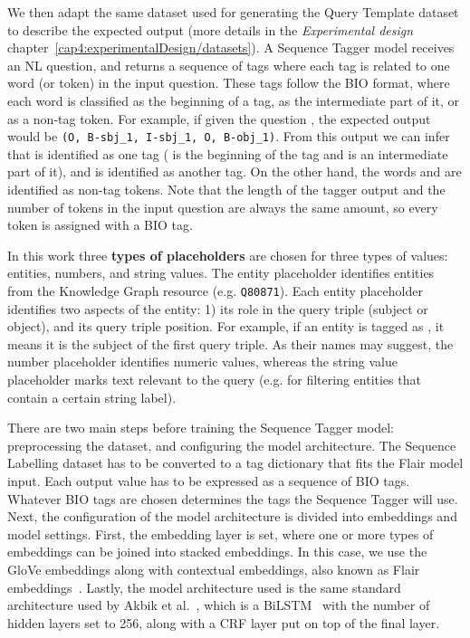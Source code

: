 We then adapt the same dataset used for generating the Query Template dataset to describe the 
expected output (more details in the \textit{Experimental design} chapter~\ref{cap4:experimentalDesign/datasets}). 
A Sequence Tagger model receives an NL 
question, and returns a sequence of tags where each tag is related to one word (or token) in 
the input question. These tags follow the BIO format, where each word is classified as the 
beginning of a tag, as the intermediate part of it, or as a non-tag token. For example, if 
given the question , the expected output would be 
\texttt{(O, B-sbj\_1, I-sbj\_1, O, B-obj\_1)}. From this output we can infer that 
 is identified as one tag ( is the beginning of 
the tag and  is an intermediate part of it), and  is 
identified as another tag. On the other hand, the words  and  are identified 
as non-tag tokens. Note that the length of the tagger output and the number of tokens in the 
input question are always the same amount, so every token is assigned with a BIO tag.

In this work three \textbf{types of placeholders} are chosen for three types of values: entities, 
numbers, and string values. The entity placeholder identifies entities from the Knowledge Graph 
resource (e.g. \texttt{Q80871}). Each entity placeholder identifies two aspects of the entity: 
1) its role in the query triple (subject or object), and its query triple position. For example, if 
an entity is tagged as , it means it is the subject of the first query triple. As 
their names may suggest, the number placeholder identifies numeric values, whereas the string value 
placeholder marks text relevant to the query (e.g. for filtering entities that contain a certain 
string label).

There are two main steps before training the Sequence Tagger model: preprocessing the 
dataset, and configuring the model architecture. The Sequence Labelling dataset has to be 
converted to a tag dictionary that fits the Flair model input. Each output value has to be 
expressed as a sequence of BIO tags. Whatever BIO tags are chosen determines the tags 
the Sequence Tagger will use. Next, the configuration of the model architecture is divided 
into embeddings and model settings. First, the embedding layer is set, where one or more 
types of embeddings can be joined into stacked embeddings. In this case, we use the GloVe 
embeddings along with contextual embeddings, also known as Flair embeddings~\cite{seqlab:flair-AkbikBBRSV19}. 
Lastly, the model architecture used is the same standard architecture used by 
Akbik et al.~\cite{seqlab:contextual-emb-AkbikBV18}, which is a BiLSTM~\cite{seqlab:HuangXY15} 
with the number of hidden layers set to 256, along with a CRF layer put on top of the final 
layer. 

